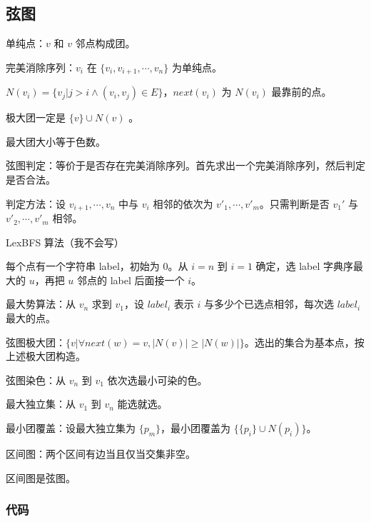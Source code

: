 \documentclass[12pt]{ctexart}
\begin{document}
\subsection{弦图}

单纯点：$v$ 和 $v$ 邻点构成团。

完美消除序列：$v_i$ 在 $\{v_i,v_{i+1},\cdots,v_n\}$ 为单纯点。

$N(v_i)=\{v_j|j>i\land (v_i,v_j)\in E\}$，$next(v_i)$ 为 $N(v_i)$ 最靠前的点。

极大团一定是 $\{v\}\cup N(v)$ 。

最大团大小等于色数。

弦图判定：等价于是否存在完美消除序列。首先求出一个完美消除序列，然后判定是否合法。

判定方法：设 $v_{i+1},\cdots,v_n$ 中与 $v_i$ 相邻的依次为 $v'_1,\cdots,v'_m$。只需判断是否 $v_1'$ 与 $v'_2,\cdots,v'_m$ 相邻。

LexBFS 算法（我不会写）

每个点有一个字符串 label，初始为 $0$。从 $i=n$ 到 $i=1$ 确定，选 label 字典序最大的 $u$，再把 $u$ 邻点的 label 后面接一个 $i$。

最大势算法：从 $v_n$ 求到 $v_1$，设 $label_i$ 表示 $i$ 与多少个已选点相邻，每次选 $label_i$ 最大的点。

弦图极大团：$\{v|\forall next(w)=v,|N(v)|\ge |N(w)|\}$。选出的集合为基本点，按上述极大团构造。

弦图染色：从 $v_n$ 到 $v_1$ 依次选最小可染的色。

最大独立集：从 $v_1$ 到 $v_n$ 能选就选。

最小团覆盖：设最大独立集为 $\{p_m\}$，最小团覆盖为 $\{\{p_i\}\cup N(p_i)\}$。

区间图：两个区间有边当且仅当交集非空。

区间图是弦图。

\subsubsection{代码}
\end{document}
